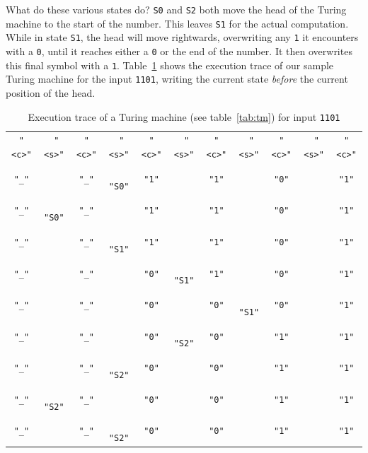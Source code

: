 \documentclass[11pt]{article}
\def\t#1{\texttt{#1}}
\def\h#1{{\tt \color{gray} #1}}
\begin{document}
%
What do these various states do? \t{S0} and \t{S2} both move the head of the
Turing machine to the start of the number. This leaves \t{S1} for the actual
computation. While in state \t{S1}, the head will move rightwards, overwriting
any \t{1} it encounters with a \t{0}, until it reaches either a \t{0} or the end
of the number. It then overwrites this final symbol with a \t{1}.
Table~\ref{tab:tmtrace} shows the execution trace of our sample Turing machine
for the input \t{1101}, writing the current state \emph{before} the current
position of the head.
%
\begin{table}[h]
  \centering
  \begin{tabular}{ccccccccccc}
    \t{"<c>"}&\h{"<s>"}&\t{"<c>"}&\h{"<s>"}&\t{"<c>"}&\h{"<s>"}&\t{"<c>"}&\h{"<s>"}&\t{"<c>"}&\h{"<s>"}&\t{"<c>"}\\
    \t{"\_"}&        &\t{"\_"}&\h{"S0"}&\t{"1"}&        &\t{"1"}&        &\t{"0"}&                   &\t{"1"}\\
    \t{"\_"}&\h{"S0"}&\t{"\_"}&        &\t{"1"}&        &\t{"1"}&        &\t{"0"}&                   &\t{"1"}\\
    \t{"\_"}&        &\t{"\_"}&\h{"S1"}&\t{"1"}&        &\t{"1"}&        &\t{"0"}&                   &\t{"1"}\\
    \t{"\_"}&        &\t{"\_"}&        &\t{"0"}&\h{"S1"}&\t{"1"}&        &\t{"0"}&                   &\t{"1"}\\
    \t{"\_"}&        &\t{"\_"}&        &\t{"0"}&        &\t{"0"}&\h{"S1"}&\t{"0"}&\hphantom{\t{"S1"}}&\t{"1"}\\
    \t{"\_"}&        &\t{"\_"}&        &\t{"0"}&\h{"S2"}&\t{"0"}&        &\t{"1"}&                   &\t{"1"}\\
    \t{"\_"}&        &\t{"\_"}&\h{"S2"}&\t{"0"}&        &\t{"0"}&        &\t{"1"}&                   &\t{"1"}\\
    \t{"\_"}&\h{"S2"}&\t{"\_"}&        &\t{"0"}&        &\t{"0"}&        &\t{"1"}&                   &\t{"1"}\\
    \t{"\_"}&        &\t{"\_"}&\h{"S2"}&\t{"0"}&        &\t{"0"}&        &\t{"1"}&                   &\t{"1"}
  \end{tabular}
  \caption{Execution trace of a Turing machine (see table~\ref{tab:tm}) for input \t{1101}}
  \label{tab:tmtrace}
\end{table}
\end{document}
